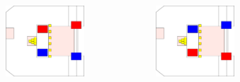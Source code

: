 \documentclass{beamer}
\begin{document}
\begin{frame}
\begin{columns}
\begin{figure}
  \end{figure}
  \begin{figure}
   \includegraphics[scale=0.15]{assets/paths/BLANK_LL}
  \end{figure}
  \begin{figure}
   \includegraphics[scale=0.15]{assets/paths/BLANK_RR}
  \end{figure}
 \end{columns}
\end{frame}
\end{document}
